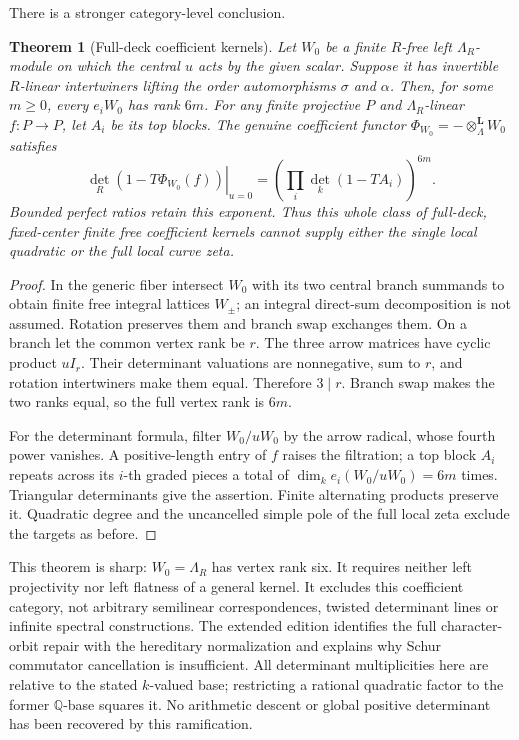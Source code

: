 \documentclass[11pt]{article}
\newtheorem{theorem}{Theorem}[section]
\theoremstyle{definition}\newtheorem{definition}[theorem]{Definition}
\theoremstyle{remark}\newtheorem{remark}[theorem]{Remark}
\begin{document}
There is a stronger category-level conclusion.
\begin{theorem}[Full-deck coefficient kernels]\label{thm:full-deck-kernel}
Let $W_0$ be a finite $R$-free left $\Lambda_R$-module on which the central $u$ acts by the given scalar. Suppose it has invertible $R$-linear intertwiners lifting the order automorphisms $\sigma$ and $\alpha$. Then, for some $m\ge0$, every $e_iW_0$ has rank $6m$. For any finite projective $P$ and $\Lambda_R$-linear $f:P\to P$, let $A_i$ be its top blocks. The genuine coefficient functor $\Phi_{W_0}= -\otimes_\Lambda^{\mathbf L} W_0$ satisfies
\[
 \left.\det_R(1-T\Phi_{W_0}(f))\right|_{u=0}
 =\left(\prod_i\det_k(1-TA_i)\right)^{6m}.
\]
Bounded perfect ratios retain this exponent. Thus this whole class of full-deck, fixed-center finite free coefficient kernels cannot supply either the single local quadratic or the full local curve zeta.
\end{theorem}
\begin{proof}
In the generic fiber intersect $W_0$ with its two central branch summands to obtain finite free integral lattices $W_\pm$; an integral direct-sum decomposition is not assumed. Rotation preserves them and branch swap exchanges them. On a branch let the common vertex rank be $r$. The three arrow matrices have cyclic product $uI_r$. Their determinant valuations are nonnegative, sum to $r$, and rotation intertwiners make them equal. Therefore $3\mid r$. Branch swap makes the two ranks equal, so the full vertex rank is $6m$.

For the determinant formula, filter $W_0/uW_0$ by the arrow radical, whose fourth power vanishes. A positive-length entry of $f$ raises the filtration; a top block $A_i$ repeats across its $i$-th graded pieces a total of $\dim_k e_i(W_0/uW_0)=6m$ times. Triangular determinants give the assertion. Finite alternating products preserve it. Quadratic degree and the uncancelled simple pole of the full local zeta exclude the targets as before.
\end{proof}
This theorem is sharp: $W_0=\Lambda_R$ has vertex rank six. It requires neither left projectivity nor left flatness of a general kernel. It excludes this coefficient category, not arbitrary semilinear correspondences, twisted determinant lines or infinite spectral constructions. The extended edition identifies the full character-orbit repair with the hereditary normalization and explains why Schur commutator cancellation is insufficient. All determinant multiplicities here are relative to the stated $k$-valued base; restricting a rational quadratic factor to the former $\mathbb Q$-base squares it. No arithmetic descent or global positive determinant has been recovered by this ramification.
\end{document}
